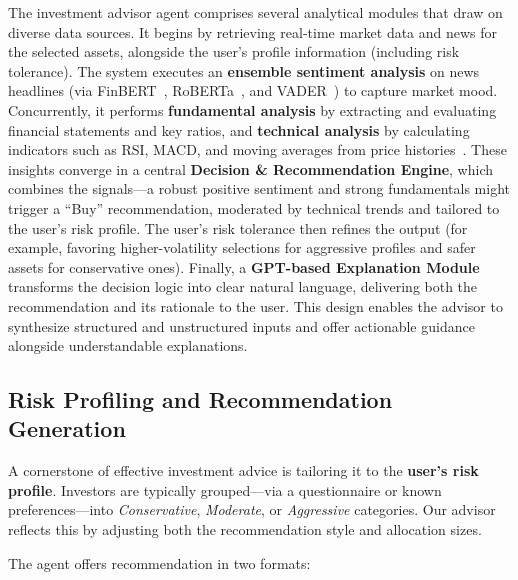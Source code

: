 \documentclass[conference]{IEEEtran}
\begin{document}
The investment advisor agent comprises several analytical modules that draw on diverse data sources. It begins by retrieving real-time market data and news for the selected assets, alongside the user’s profile information (including risk tolerance). The system executes an \textbf{ensemble sentiment analysis} on news headlines (via FinBERT~\cite{b3}, RoBERTa~\cite{b4}, and VADER~\cite{b5}) to capture market mood. Concurrently, it performs \textbf{fundamental analysis} by extracting and evaluating financial statements and key ratios, and \textbf{technical analysis} by calculating indicators such as RSI, MACD, and moving averages from price histories~\cite{hossain2019}. These insights converge in a central \textbf{Decision \& Recommendation Engine}, which combines the signals—a robust positive sentiment and strong fundamentals might trigger a ``Buy'' recommendation, moderated by technical trends and tailored to the user’s risk profile. The user’s risk tolerance then refines the output (for example, favoring higher-volatility selections for aggressive profiles and safer assets for conservative ones). Finally, a \textbf{GPT-based Explanation Module} transforms the decision logic into clear natural language, delivering both the recommendation and its rationale to the user. This design enables the advisor to synthesize structured and unstructured inputs and offer actionable guidance alongside understandable explanations.



\subsection{Risk Profiling and Recommendation Generation}

A cornerstone of effective investment advice is tailoring it to the \textbf{user’s risk profile}. Investors are typically grouped—via a questionnaire or known preferences—into \textit{Conservative}, \textit{Moderate}, or \textit{Aggressive} categories. Our advisor reflects this by adjusting both the recommendation style and allocation sizes.

The agent offers recommendation in two formats:
\end{document}
